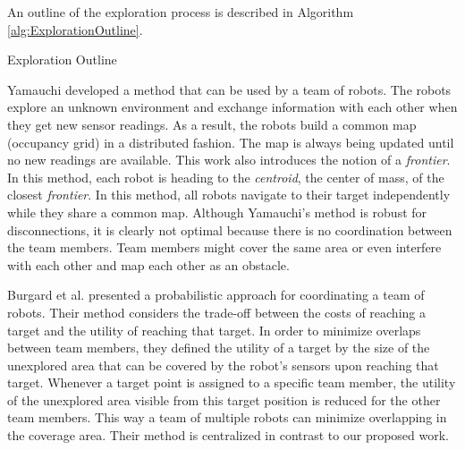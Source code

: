 \documentclass[a4paper,10pt]{article}
\begin{document}
An outline of the exploration process is described in Algorithm
\ref{alg:ExplorationOutline}.

\begin{algorithm}%
\caption{Exploration Outline}
\label{alg:ExplorationOutline}
\begin{algorithmic}[1]
\ENDWHILE
\end{algorithmic}
\end{algorithm}

Yamauchi \cite{yamauchi_frontier-based_1997, yamauchi_frontier-based_1998}
developed a method that can be used by a team of robots. The robots explore an
unknown environment and exchange information with each other when they get new
sensor readings. As a result, the robots build a common map (occupancy grid) in
a distributed fashion. The map is always being updated until no new readings are
available. This work also introduces the notion of a \emph{frontier}. In
this method, each robot is heading to the \emph{centroid}, the center of mass, 
of the closest \emph{frontier}. In this
method, all robots navigate to their target independently while they share a
common map. Although Yamauchi's method is robust for disconnections, it is
clearly not optimal because there is no coordination between the team members.
Team members might cover the same area or even interfere with each other and
map each other as an obstacle. 

Burgard et al. \cite{burgard_collaborative_2000} presented a probabilistic
approach for coordinating a team of robots. Their method considers the
trade-off between the costs of reaching a target and the utility of reaching
that target. In order to minimize overlaps between team members, they defined
the utility of a target by the size of the unexplored area that can be covered
by the robot's sensors upon reaching that target. Whenever a target point is
assigned to a specific team member, the utility of the unexplored area visible
from this target position is reduced for the other team members. This way a team
of multiple robots can minimize overlapping in the coverage area. Their method
is centralized in contrast to our proposed work.
\end{document}
